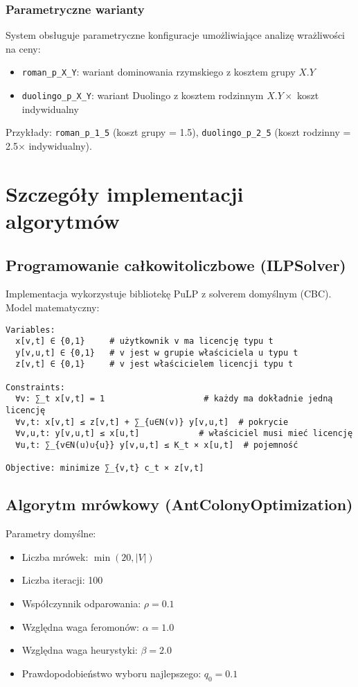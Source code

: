 \subsubsection{Parametryczne warianty}

System obsługuje parametryczne konfiguracje umożliwiające analizę wrażliwości na ceny:

\begin{itemize}
\item \texttt{roman\_p\_X\_Y}: wariant dominowania rzymskiego z kosztem grupy $X.Y$
\item \texttt{duolingo\_p\_X\_Y}: wariant Duolingo z kosztem rodzinnym $X.Y \times$ koszt indywidualny
\end{itemize}

Przykłady: \texttt{roman\_p\_1\_5} (koszt grupy = 1.5), \texttt{duolingo\_p\_2\_5} (koszt rodzinny = 2.5$\times$ indywidualny).

\section{Szczegóły implementacji algorytmów}

\subsection{Programowanie całkowitoliczbowe (ILPSolver)}

Implementacja wykorzystuje bibliotekę PuLP z solverem domyślnym (CBC). Model matematyczny:

\begin{verbatim}
Variables:
  x[v,t] ∈ {0,1}     # użytkownik v ma licencję typu t
  y[v,u,t] ∈ {0,1}   # v jest w grupie właściciela u typu t
  z[v,t] ∈ {0,1}     # v jest właścicielem licencji typu t

Constraints:
  ∀v: ∑_t x[v,t] = 1                    # każdy ma dokładnie jedną licencję
  ∀v,t: x[v,t] ≤ z[v,t] + ∑_{u∈N(v)} y[v,u,t]  # pokrycie
  ∀v,u,t: y[v,u,t] ≤ x[u,t]            # właściciel musi mieć licencję
  ∀u,t: ∑_{v∈N(u)∪{u}} y[v,u,t] ≤ K_t × x[u,t]  # pojemność

Objective: minimize ∑_{v,t} c_t × z[v,t]
\end{verbatim}

\subsection{Algorytm mrówkowy (AntColonyOptimization)}

Parametry domyślne:
\begin{itemize}
\item Liczba mrówek: $\min(20, |V|)$
\item Liczba iteracji: 100
\item Współczynnik odparowania: $\rho = 0.1$
\item Względna waga feromonów: $\alpha = 1.0$
\item Względna waga heurystyki: $\beta = 2.0$
\item Prawdopodobieństwo wyboru najlepszego: $q_0 = 0.1$
\end{itemize}


